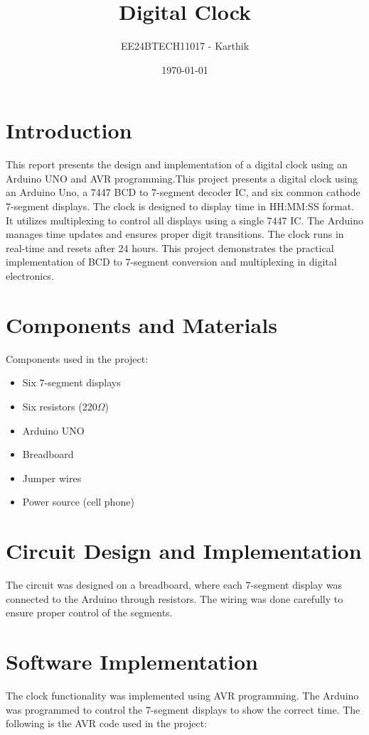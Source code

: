 \documentclass[journal]{IEEEtran}
\title{Digital Clock}
\author{EE24BTECH11017 - Karthik}
\date{\today}
\begin{document}
\maketitle

\section{Introduction}
This report presents the design and implementation of a digital clock using an Arduino UNO and AVR programming.This project presents a digital clock using an Arduino Uno, a 7447 BCD to 7-segment decoder IC, and six common cathode 7-segment displays. The clock is designed to display time in HH:MM:SS format. It utilizes multiplexing to control all displays using a single 7447 IC. The Arduino manages time updates and ensures proper digit transitions. The clock runs in real-time and resets after 24 hours. This project demonstrates the practical implementation of BCD to 7-segment conversion and multiplexing in digital electronics.


\section{Components and Materials}
Components used in the project:
\begin{itemize}
    \item Six 7-segment displays
    \item Six resistors (220$\Omega$)
    \item Arduino UNO
    \item Breadboard
    \item Jumper wires
    \item Power source (cell phone)
\end{itemize}

\section{Circuit Design and Implementation}
The circuit was designed on a breadboard, where each 7-segment display was connected to the Arduino through resistors. The wiring was done carefully to ensure proper control of the segments.

\section{Software Implementation}
The clock functionality was implemented using AVR programming. The Arduino was programmed to control the 7-segment displays to show the correct time. The following is the AVR code used in the project:
\end{document}
